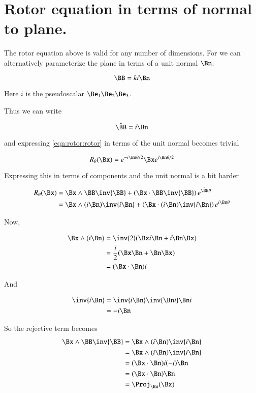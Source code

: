 \section{Rotor equation in terms of normal to plane. }

The rotor equation above is valid for any number of dimensions.  For  we can alternatively parameterize the plane in terms of
a unit normal $\Bn$:

\[
\BB = k i\Bn
\]

Here $i$ is the  pseudoscalar $\Be_1 \Be_2 \Be_3$.

Thus we can write

\[
\hat{\BB} = i\Bn
\]

and expressing \ref{eqn:rotor:rotor} in terms of the unit normal becomes trivial

\begin{equation}
R_\theta(\Bx) 
= e^{- i {\Bn}\theta/2} \Bx e^{i{\Bn}\theta/2}
\end{equation}

Expressing this in terms of components and the unit normal is a bit harder

\begin{align*}
R_\theta(\Bx) 
&= \Bx \wedge \BB \inv{\BB} + \left(\Bx \cdot \BB \inv{\BB}\right)e^{\hat{\BB}\theta} \\
&= \Bx \wedge (i\Bn) \inv{i\Bn} + \left(\Bx \cdot (i\Bn) \inv{i\Bn}\right)e^{{i\Bn}\theta} \\
\end{align*}

Now, 

\begin{align*}
\Bx \wedge (i\Bn) 
&= \inv{2}(\Bx i \Bn + i \Bn \Bx) \\
&= \frac{i}{2}(\Bx \Bn + \Bn \Bx) \\
&= (\Bx \cdot \Bn) i
\end{align*}

And

\begin{align*}
\inv{i\Bn} 
&= \inv{i\Bn} \inv{\Bn i} \Bn i \\
&= - i \Bn \\
\end{align*}

So the rejective term becomes
\begin{align*}
\Bx \wedge \BB \inv{\BB} 
&= \Bx \wedge (i\Bn) \inv{i\Bn} \\
&= \Bx \wedge (i\Bn) \inv{i\Bn} \\
&= (\Bx \cdot \Bn) i (-i) \Bn \\
&= (\Bx \cdot \Bn) \Bn \\
&= \Proj_{\Bn}(\Bx) \\
\end{align*}

